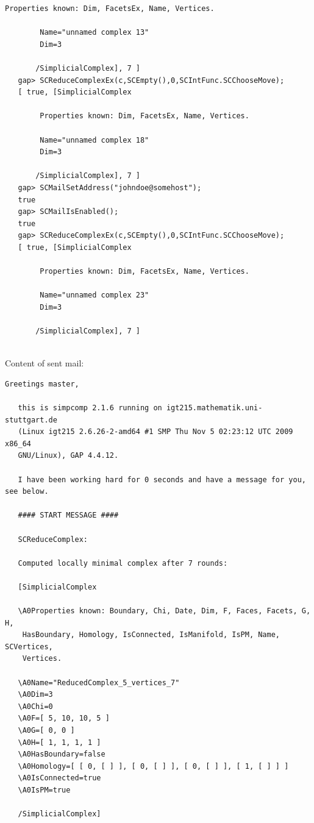 \documentclass[a4paper,11pt]{report}
\begin{document}
{{{\begin{Verbatim}[commandchars=!|G,fontsize=\small,frame=single,label=Example]
        Properties known: Dim, FacetsEx, Name, Vertices.
       
        Name="unnamed complex 13"
        Dim=3
       
       /SimplicialComplex], 7 ]
   gap> SCReduceComplexEx(c,SCEmpty(),0,SCIntFunc.SCChooseMove);
   [ true, [SimplicialComplex
       
        Properties known: Dim, FacetsEx, Name, Vertices.
       
        Name="unnamed complex 18"
        Dim=3
       
       /SimplicialComplex], 7 ]
   gap> SCMailSetAddress("johndoe@somehost");   
   true
   gap> SCMailIsEnabled();                     
   true
   gap> SCReduceComplexEx(c,SCEmpty(),0,SCIntFunc.SCChooseMove);
   [ true, [SimplicialComplex
       
        Properties known: Dim, FacetsEx, Name, Vertices.
       
        Name="unnamed complex 23"
        Dim=3
       
       /SimplicialComplex], 7 ]
   
\end{Verbatim}
 Content of sent mail: 
\begin{Verbatim}[commandchars=@|J,fontsize=\small,frame=single,label=Example]
   Greetings master,
   
   this is simpcomp 2.1.6 running on igt215.mathematik.uni-stuttgart.de
   (Linux igt215 2.6.26-2-amd64 #1 SMP Thu Nov 5 02:23:12 UTC 2009 x86_64
   GNU/Linux), GAP 4.4.12.
   
   I have been working hard for 0 seconds and have a message for you, see below.
   
   #### START MESSAGE ####
   
   SCReduceComplex:
   
   Computed locally minimal complex after 7 rounds:
   
   [SimplicialComplex
   
   \A0Properties known: Boundary, Chi, Date, Dim, F, Faces, Facets, G, H,
    HasBoundary, Homology, IsConnected, IsManifold, IsPM, Name, SCVertices,
    Vertices.
   
   \A0Name="ReducedComplex_5_vertices_7"
   \A0Dim=3
   \A0Chi=0
   \A0F=[ 5, 10, 10, 5 ]
   \A0G=[ 0, 0 ]
   \A0H=[ 1, 1, 1, 1 ]
   \A0HasBoundary=false
   \A0Homology=[ [ 0, [ ] ], [ 0, [ ] ], [ 0, [ ] ], [ 1, [ ] ] ]
   \A0IsConnected=true
   \A0IsPM=true
   
   /SimplicialComplex]
   

\end{Verbatim}}}}
\end{document}
